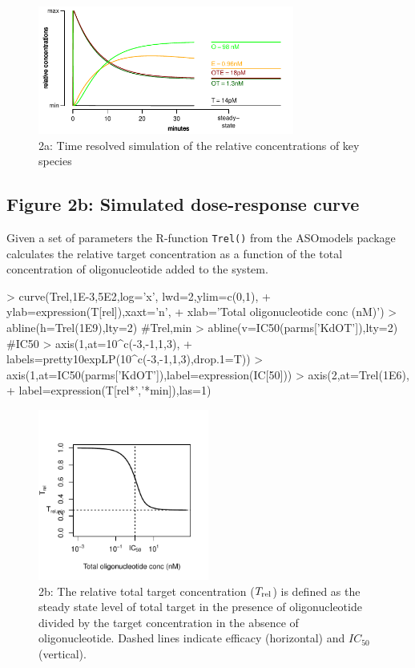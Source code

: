 \documentclass{article}
\newenvironment{Ncenter}{%
  \setlength\topsep{-10pt}
  \setlength\parskip{-100pt}
  \begin{center}
}{%
  \end{center}
}
\newcommand{\Trel}{T_{\rm{rel}}}
\begin{document}
\begin{figure}[!h]
\begin{Ncenter}
\includegraphics[width=0.75\textwidth]{Vignette2-Fig1}
\end{Ncenter}
\caption{2a: Time resolved simulation of the relative concentrations of key species}
\end{figure}

\subsection*{Figure 2b: Simulated dose-response curve}
Given a set of parameters the R-function \texttt{Trel()} from the ASOmodels package calculates the relative target concentration as a function of the total concentration of oligonucleotide added to the system.
\begin{Schunk}
\begin{Sinput}
> curve(Trel,1E-3,5E2,log='x', lwd=2,ylim=c(0,1),
+       ylab=expression(T[rel]),xaxt='n',
+       xlab='Total oligonucleotide conc (nM)')
> abline(h=Trel(1E9),lty=2) #Trel,min
> abline(v=IC50(parms['KdOT']),lty=2) #IC50
> axis(1,at=10^c(-3,-1,1,3),
+      labels=pretty10expLP(10^c(-3,-1,1,3),drop.1=T))
> axis(1,at=IC50(parms['KdOT']),label=expression(IC[50]))
> axis(2,at=Trel(1E6),
+      label=expression(T[rel*','*min]),las=1)
\end{Sinput}
\end{Schunk}
\begin{figure}[!h]
\begin{Ncenter}
\includegraphics[width=0.5\textwidth]{Vignette2-Fig2}
\end{Ncenter}
\caption{2b: The relative total target concentration ($\Trel$) is defined as the steady state level of total target in the presence of oligonucleotide divided by the target concentration in the absence of oligonucleotide. Dashed lines indicate efficacy (horizontal) and $IC_{50}$ (vertical).}
\end{figure}
\end{document}
